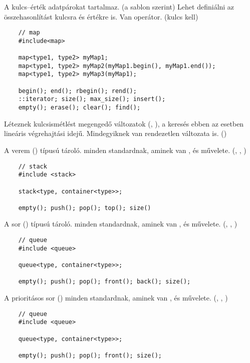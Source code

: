 \documentclass[main.tex]{subfiles}
\begin{document}
  A  kulcs–érték adatpárokat tartalmaz.
  (a  sablon szerint) Lehet definiálni az
  összehasonlítást kulcsra és értékre is.
  Van \kkod{[]} operátor. (kulcs kell)
  \begin{lstlisting}
    // map
    #include<map>

    map<type1, type2> myMap1;
    map<type1, type2> myMap2(myMap1.begin(), myMap1.end());
    map<type1, type2> myMap3(myMap1);

    begin(); end(); rbegin(); rend();
    ::iterator; size(); max_size(); insert();
    empty(); erase(); clear(); find();
  \end{lstlisting}

  Léteznek kulcsismétlést megengedő változatok
  (, ),
  a keresés ebben az esetben lineáris végrehajtási idejű.
  Mindegyiknek van rendezetlen változata is.
  ()

  A verem ()  típusú tároló.
   minden standardnak, aminek van
  , 
  és  művelete.
  (, , )
  \begin{lstlisting}
    // stack
    #include <stack>

    stack<type, container<type>>;

    empty(); push(); pop(); top(); size()
  \end{lstlisting}

  A sor ()  típusú tároló.
   minden standardnak, aminek van
  , 
  és  művelete.
  (, , )
  \begin{lstlisting}
    // queue
    #include <queue>

    queue<type, container<type>>;

    empty(); push(); pop(); front(); back(); size();
  \end{lstlisting}

  A prioritásos sor ()
   minden standardnak, aminek van
  , 
  és  művelete.
  (, , )
  \begin{lstlisting}
    // queue
    #include <queue>

    queue<type, container<type>>;

    empty(); push(); pop(); front(); size();
  \end{lstlisting}

  
\end{document}
